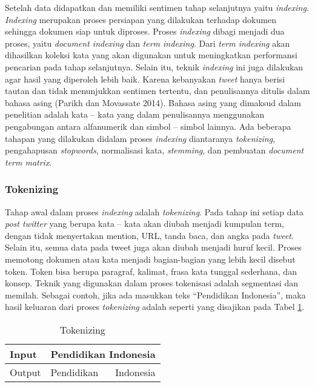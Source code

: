 Setelah data didapatkan dan memiliki sentimen tahap selanjutnya yaitu \textit{indexing}. \textit{Indexing} merupakan proses persiapan yang dilakukan terhadap dokumen sehingga dokumen siap untuk diproses. Proses \textit{indexing} dibagi menjadi dua proses, yaitu \textit{document indexing} dan \textit{term indexing}. Dari \textit{term indexing} akan dihasilkan koleksi kata yang akan digunakan untuk meningkatkan performansi pencarian pada tahap selanjutnya. Selain itu, teknik \textit{indexing} ini juga dilakukan agar hasil yang diperoleh lebih baik. Karena kebanyakan \textit{tweet} hanya berisi tautan dan tidak menunjukkan sentimen tertentu, dan penulisannya ditulis dalam bahasa asing (Parikh dan Movassate 2014). Bahasa asing yang dimaksud dalam penelitian adalah kata – kata yang dalam penulisannya menggunakan pengabungan antara alfanumerik dan simbol – simbol lainnya. Ada beberapa tahapan  yang dilakukan didalam proses \textit{indexing} diantaranya \textit{tokenizing}, pengahapusan \textit{stopwords}, normalisasi kata, \textit{stemming}, dan pembuatan \textit{document term matrix}.


\subsubsection*{Tokenizing}
Tahap awal dalam proses \textit{indexing} adalah \textit{tokenizing}. Pada tahap ini setiap data \textit{post twitter} yang berupa kata – kata akan diubah menjadi kumpulan term, dengan tidak menyertakan mention, URL, tanda baca, dan angka pada \textit{tweet}. Selain itu, semua data pada tweet juga akan diubah menjadi huruf kecil. Proses memotong dokumen atau kata menjadi bagian-bagian yang lebih kecil disebut token. Token bisa berupa paragraf, kalimat, frasa kata tunggal sederhana, dan konsep. Teknik yang digunakan dalam proses tokenisasi adalah segmentasi dan memilah. Sebagai contoh, jika ada masukkan teks “Pendidikan Indonesia”, maka hasil keluaran dari proses \textit{tokenizing} adalah seperti yang disajikan pada Tabel \ref{tab:tokenizing}.

\begin{table}[hbt]
	\caption{Tokenizing}
	\centering
	\begin{tabular}{llr}
		\toprule
		Input & \multicolumn{2}{c}{Pendidikan Indonesia} \\
		\midrule
		Output & Pendidikan & Indonesia\\
		\bottomrule
	\end{tabular}
	\label{tab:tokenizing}
\end{table}

